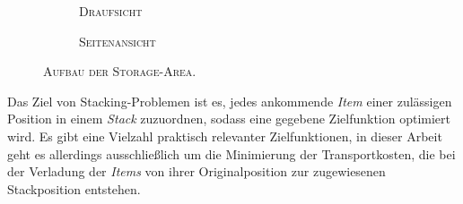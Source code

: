 \begin{figure}[H]
\centering

\begin{subfigure}[b]{\textwidth}
\centering
{}
\caption*{\textsc{Draufsicht}}
\label{}
\end{subfigure}
\par\bigskip
\begin{subfigure}[b]{\textwidth}
\centering
{}
\caption*{\textsc{Seitenansicht}}
\label{}
\end{subfigure}

\caption{\textsc{Aufbau der Storage-Area}.}
\label{fig:storage_area}
\end{figure}

\pagebreak

Das Ziel von Stacking-Problemen ist es, jedes ankommende \textit{Item} einer zulässigen Position in einem
\textit{Stack} zuzuordnen, sodass eine gegebene Zielfunktion optimiert wird. Es gibt eine Vielzahl praktisch relevanter Zielfunktionen,
in dieser Arbeit geht es allerdings ausschließlich um die Minimierung der Transportkosten, die bei der Verladung der \textit{Items} von ihrer Originalposition zur zugewiesenen Stackposition entstehen.

\pagebreak

